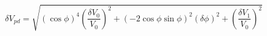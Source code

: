 \begin{equation}
\label{eq:delta_V_Malus}
\delta V_{pd} = \sqrt{ {\left(\cos{\phi}\right)}^4\left(\frac{\delta V_0}{V_0}\right)^2 + \left(-2 \cos{\phi}\sin{\phi} \right)^2(\delta \phi)^2+ \left(\frac{\delta V_1}{V_0}\right)^2}
\end{equation}